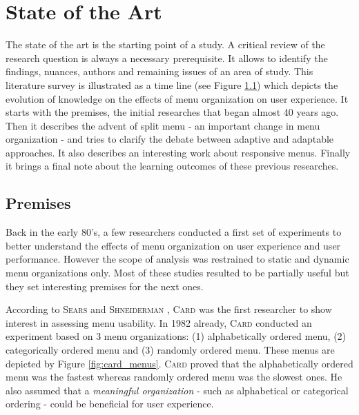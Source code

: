 \cleardoublepage
\chapter{State of the Art}

The state of the art is the starting point of a study. A critical 
review of the research question is always a necessary prerequisite. It allows 
to identify the findings, nuances, authors and remaining issues of an area of 
study. This literature survey is illustrated as a time line (see Figure 
\ref{fig:timeline}) which depicts the evolution of knowledge on the effects 
of menu organization on user experience. It starts with the premises, the 
initial researches that began almost 40 years ago. Then it 
describes the advent of split menu - an important change in menu organization - 
and tries to clarify the debate between adaptive and adaptable approaches. It 
also describes an interesting work about responsive menus. Finally it brings a 
final note about the learning outcomes of these previous researches.

\begin{figure}[ht!]
  
  \label{fig:timeline}
\end{figure}

\section{Premises}

Back in the early 80’s, a few researchers conducted a first set of experiments 
to better understand the effects of menu organization on user experience and 
user performance. However the scope of analysis was restrained to static and 
dynamic menu organizations only. Most of these studies resulted to be partially 
useful but they set interesting premises for the next ones.\newline
 
According to \textsc{Sears} and \textsc{Shneiderman} \cite{sears}, 
\textsc{Card} \cite{card} was the first researcher to show interest in assessing 
menu usability. In 1982 already, \textsc{Card} conducted an experiment based on 
3 menu organizations: (1) alphabetically ordered menu, (2) categorically ordered 
menu and (3) randomly ordered menu. These menus are depicted by Figure 
\ref{fig:card_menus}. \textsc{Card} proved that the alphabetically ordered 
menu was the fastest whereas randomly ordered menu was the slowest ones. He 
also assumed that a \textit{meaningful organization} - such as 
alphabetical or categorical ordering - could be beneficial for user 
experience.\newline

